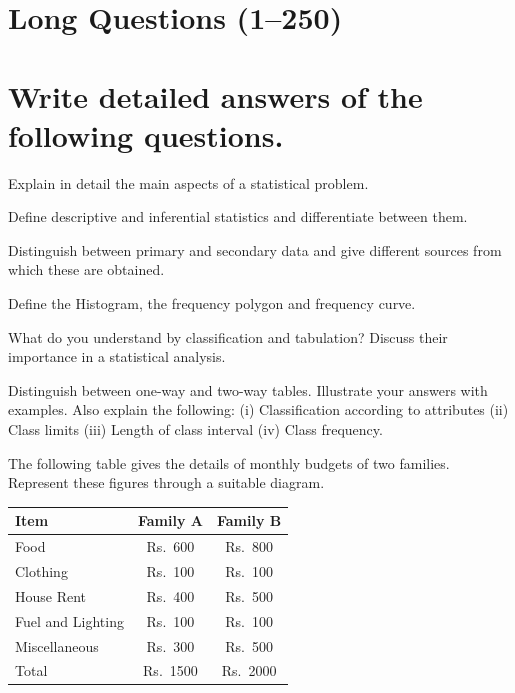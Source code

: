 \documentclass[11pt,a4paper]{article}
\begin{document}
\newpage

\section{Long Questions (1--250)}

\section*{Write detailed answers of the following questions.}

\begin{longlist}

\item Explain in detail the main aspects of a statistical problem.

\item Define descriptive and inferential statistics and differentiate between them.

\item Distinguish between primary and secondary data and give different sources from which these are obtained.

\item Define the Histogram, the frequency polygon and frequency curve.

\item What do you understand by classification and tabulation? Discuss their importance in a statistical analysis.

\item Distinguish between one-way and two-way tables. Illustrate your answers with examples. Also explain the following: (i) Classification according to attributes (ii) Class limits (iii) Length of class interval (iv) Class frequency.

\item The following table gives the details of monthly budgets of two families. Represent these figures through a suitable diagram.
\begin{center}
\begin{tabular}{lcc}
Item & Family A & Family B \\
\hline
Food & Rs.\ 600 & Rs.\ 800 \\
Clothing & Rs.\ 100 & Rs.\ 100 \\
House Rent & Rs.\ 400 & Rs.\ 500 \\
Fuel and Lighting & Rs.\ 100 & Rs.\ 100 \\
Miscellaneous & Rs.\ 300 & Rs.\ 500 \\
\hline
Total & Rs.\ 1500 & Rs.\ 2000
\end{tabular}
\end{center}


\end{longlist}
\end{document}
